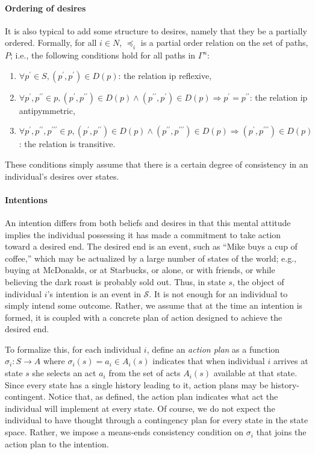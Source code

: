 \documentclass[
11pt,
titlepage,
reqno,
]{article}%
\theoremstyle{definition}
\begin{document}
	\paragraph{Ordering of desires \label{para: desire ordering}} 
	It is also typical to add some structure to desires, namely that they be a partially ordered. 
	Formally, for all $i\in N$, $\preceq_i$ is a partial order relation on the set of paths, $P$; i.e., the following conditions hold for all paths in $\Gamma^n$:
	\begin{enumerate}
		\item $\forall  p^\prime\in S, (p^\prime,p^\prime)\in D(p)$: the relation ip reflexive,
		\item $\forall  p^\prime,p^{\prime\prime}\in p,(p^\prime,p^{\prime\prime})\in D(p)\wedge (p^{\prime\prime},p^\prime)\in D(p)\Rightarrow p^\prime=p^{\prime\prime}$: the relation ip antipymmetric,
		\item $\forall  p^\prime, p^{\prime\prime}, p^{\prime\prime\prime}\in p, (p^\prime,p^{\prime\prime})\in D(p)\wedge (p^{\prime\prime},p^{\prime\prime\prime})\in D(p)\Rightarrow  (p^{\prime},p^{\prime\prime\prime})\in D(p)$: the relation is transitive.
	\end{enumerate} 
	These conditions simply assume that there is a certain degree of consistency in an individual's desires over states. 
	
	\paragraph{Intentions\label{para: intentons}} 
	An intention differs from both beliefs and desires in that this mental attitude implies the individual possessing it has made a commitment to take action toward a desired end. 
	The desired end is an event, such as ``Mike buys a cup of coffee,'' which may be actualized by a large number of states of the world; e.g., buying at McDonalds, or at Starbucks, or alone, or with friends, or while believing the dark roast is probably sold out. Thus, in state $s$, the object of individual $i$'s intention is an event in $\mathcal{S}$. 
	It is not enough for an individual to simply intend some outcome. 
	Rather, we assume that at the time an intention is formed, it is coupled with a concrete plan of action designed to achieve the desired end. 
	
	To formalize this, for each individual $i$, define an \textit{action plan} as a function $\sigma_i:S\rightarrow A$ where $\sigma_i(s)=a_i\in A_i(s)$ indicates that when individual $i$ arrives at state $s$ she selects an act $a_i$ from the set of acts $A_i(s)$ available at that state. 
	Since every state has a single history leading to it, action plans may be history-contingent.
	Notice that, as defined, the action plan indicates what act the individual will implement at every state. 
	Of course, we do not expect the individual to have thought through a contingency plan for every state in the state space. 
	Rather, we impose a means-ends consistency condition on $\sigma_i$ that joins the action plan to the intention.
	
\end{document}
